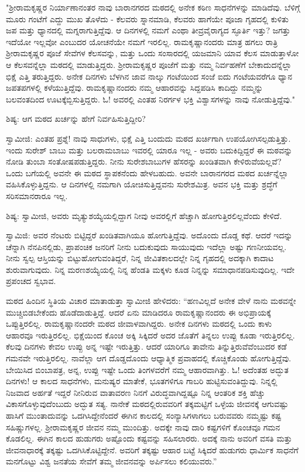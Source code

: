 "ಶ‍್ರೀರಾಮಕೃಷ್ಣರ ನಿರ್ಯಾಣಾನಂತರ ನಾವು ಬಾರಾನಗರದ ಮಠದಲ್ಲಿ ಅನೇಕ ಕಠಿಣ ಸಾಧನೆಗಳನ್ನು ಮಾಡಿದೆವು. ಬೆಳಿಗ್ಗೆ ಮೂರು ಗಂಟೆಗೆ ಎದ್ದು ಮುಖ ತೊಳೆದು - ಕೆಲವರು ಸ್ನಾನಮಾಡಿ, ಕೆಲವರು ಹಾಗೆಯೇ ಪೂಜಾ ಗೃಹದಲ್ಲಿ ಕುಳಿತು ಜಪ ಮತ್ತು ಧ್ಯಾನದಲ್ಲಿ ಮಗ್ನರಾಗುತ್ತಿದ್ದೆವು. ಆ ದಿನಗಳಲ್ಲಿ ನಮಗೆ ಎಂಥಾ ತೀವ್ರವೈರಾಗ್ಯದ ಸ್ಫೂರ್ತಿ ಇತ್ತು? ಜಗತ್ತು ಇದೆಯೋ ಇಲ್ಲವೋ ಎಂಬುದರ ಯೋಚನೆಯೇ ನಮಗೆ ಇರಲಿಲ್ಲ. ರಾಮಕೃಷ್ಣಾನಂದರು ಮಾತ್ರ ಹಗಲು ರಾತ್ರಿ ಶ‍್ರೀರಾಮಕೃಷ್ಣರ ಪೂಜೆ ಸೇವೆಗಳ ಕೆಲಸವನ್ನು, ಮತ್ತು ಒಂದು ಸಂಸಾರದಲ್ಲಿ ಯಜಮಾನಿ ಯಾವ ಕೆಲಸ ಮಾಡುತ್ತಾಳೋ ಆ ಕೆಲಸವನ್ನೆಲ್ಲಾ ಮಠದಲ್ಲಿ ಮಾಡುತ್ತಿದ್ದರು. ಶ‍್ರೀರಾಮಕೃಷ್ಣರ ಪೂಜೆಗೆ ಮತ್ತು ನಮ್ಮ ನಿರ್ವಹಣೆಗೆ ಬೇಕಾದುದನ್ನೆಲ್ಲಾ ಭಿಕ್ಷೆ ಎತ್ತಿ ತರುತ್ತಿದ್ದರು. ಅನೇಕ ದಿನಗಳು ಬೆಳಗಿನ ಜಾವ ನಾಲ್ಕು ಗಂಟೆಯಿಂದ ಸಂಜೆ ಐದು ಗಂಟೆಯವರೆಗೂ ಧ್ಯಾನ ಜಪತಪಗಳಲ್ಲಿ ಕಳೆಯುತ್ತಿದ್ದೆವು. ರಾಮಕೃಷ್ಣಾನಂದರು ನಮ್ಮ ಆಹಾರವನ್ನು ಸಿದ್ದಪಡಿಸಿ ಕಾದಿದ್ದು ನಮ್ಮನ್ನು ಬಲವಂತದಿಂದ ಊಟಕ್ಕೆಬ್ಬಿಸುತ್ತಿದ್ದರು. ಓ! ಅವರಲ್ಲಿ ಎಂತಹ ನಿರರ್ಗಳ ಭಕ್ತಿ ವಿಶ್ವಾಸಗಳನ್ನು ನಾವು ನೋಡುತ್ತಿದ್ದೆವು."

ಶಿಷ್ಯ: ಆಗ ಮಠದ ಖರ್ಚನ್ನು ಹೇಗೆ ನಿರ್ವಹಿಸುತ್ತಿದ್ದೀರಿ?

ಸ್ವಾಮೀಜಿ: ಎಂತಹ ಪ್ರಶ್ನೆ! ನಾವು ಸಾಧುಗಳು, ಭಿಕ್ಷೆ ಎತ್ತಿ ಬಂದುದು ಮಠದ ಖರ್ಚಿಗಾಗಿ ಉಪಯೋಗಿಸಲ್ಪಡುತ್ತಿತ್ತು. ಇಂದು ಸುರೇಶ್ ಬಾಬು ಮತ್ತು ಬಲರಾಮಬಾಬು ಇವರಲ್ಲಿ ಯಾರೂ ಇಲ್ಲ - ಅವರು ಬದುಕಿದ್ದಿದ್ದರೆ ಈ ಮಠವನ್ನು ನೋಡಿ ತುಂಬಾ ಸಂತೋಷಪಡುತ್ತಿದ್ದರು. ನೀನು ಸುರೇಶಬಾಬುಗಳ ಹೆಸರನ್ನು ಖಂಡಿತವಾಗಿ ಕೇಳಿರುವೆಯಲ್ಲವೆ? ಒಂದು ಬಗೆಯಲ್ಲಿ ಅವನೇ ಈ ಮಠದ ಸ್ಥಾಪಕನೆಂದು ಹೇಳಬಹುದು. ಅವನೇ ಬಾರಾನಗರದ ಮಠದ ಖರ್ಚನ್ನೆಲ್ಲಾ ವಹಿಸಿಕೊಳ್ಳುತ್ತಿದ್ದನು. ಆ ದಿನಗಳಲ್ಲಿ ನಮಗಾಗಿ ಯೋಚಿಸುತ್ತಿದ್ದವನು ಸುರೇಶಮಿತ್ರ. ಅವನ ಭಕ್ತಿ ಮತ್ತು ಶ್ರದ್ಧೆಗೆ ಸರಿಸಮಾನರಾರೂ ಇಲ್ಲ.

ಶಿಷ್ಯ: ಸ್ವಾಮೀಜಿ, ಅವರು ಮೃತ್ಯುಶಯ್ಯೆಯಲ್ಲಿದ್ದಾಗ ನೀವು ಅವರಲ್ಲಿಗೆ ಹೆಚ್ಚಾಗಿ ಹೋಗುತ್ತಿರಲಿಲ್ಲವೆಂದು ಕೇಳಿದೆ.

ಸ್ವಾಮಿಜಿ: ಅವರ ನೆಂಟರು ಬಿಟ್ಟಿದ್ದರೆ ಖಂಡಿತವಾಗಿಯೂ ಹೋಗುತ್ತಿದ್ದೆವು. ಅದೊಂದು ದೊಡ್ಡ ಕಥೆ. ಆದರೆ ಇದನ್ನು ಚೆನ್ನಾಗಿ ನೆನಪಿನಲ್ಲಿಡು, ಪ್ರಾಪಂಚಿಕ ಜನರಿಗೆ ನೀನು ಬದುಕುವುದು ಸಾಯುವುದು ಇದೆಲ್ಲಾ ಅಷ್ಟು ಗಣನೀಯವಲ್ಲ. ನೀನು ಸ್ವಲ್ಪ ಆಸ್ತಿಯನ್ನು ಬಿಟ್ಟುಹೋಗುವಂತಿದ್ದರೆ, ನಿನ್ನ ಜೀವಿತಕಾಲದಲ್ಲೇ ನಿನ್ನ ಗೃಹದಲ್ಲಿ ಅದಕ್ಕಾಗಿ ಕಾದಾಟ ಶುರುವಾಗುವುದು. ನಿನ್ನ ಮರಣಶಯ್ಯೆಯಲ್ಲಿ ನಿನ್ನ ಹೆಂಡತಿ ಮಕ್ಕಳು ಕೂಡ ನಿನ್ನನ್ನು ಸಮಾಧಾನಪಡಿಸುವುದಿಲ್ಲ. ಇದೇ ಪ್ರಪಂಚದ ಸ್ವಭಾವ.

ಮಠದ ಹಿಂದಿನ ಸ್ಥಿತಿಯ ವಿಚಾರ ಮಾತಾಡುತ್ತಾ ಸ್ವಾಮೀಜಿ ಹೇಳಿದರು: “ಹಣವಿಲ್ಲದೆ ಅನೇಕ ವೇಳೆ ನಾನು ಮಠವನ್ನೇ ಮುಚ್ಚಿಬಿಡಬೇಕೆಂದು ಹೊಡೆದಾಡುತ್ತಿದ್ದೆ. ಆದರೆ ಏನು ಮಾಡಿದರೂ ರಾಮಕೃಷ್ಣಾನಂದರು ಈ ಅಭಿಪ್ರಾಯಕ್ಕೆ ಒಪ್ಪುತ್ತಿರಲಿಲ್ಲ. ರಾಮಕೃಷ್ಣಾನಂದರೇ ಮಠದ ಜೀವಾಳವಾಗಿದ್ದರು. ಅನೇಕ ದಿನಗಳು ಮಠದಲ್ಲಿ ಒಂದು ಕಾಳು ಆಹಾರವೂ ಇರುತ್ತಿರಲಿಲ್ಲ. ಭಿಕ್ಷೆಯಿಂದ ಕೊಂಚ ಅಕ್ಕಿ ಸಿಕ್ಕಿದರೆ ಅದರ ಜೊತೆಗೆ ತಿನ್ನಲು ಉಪ್ಪು ಕೂಡಾ ಇರುತ್ತಿರಲಿಲ್ಲ. ಕೆಲವು ದಿನಗಳು ಕೇವಲ ಉಪ್ಪು ಅನ್ನ ಇಷ್ಟೇ ಇರುತ್ತಿತ್ತು. ಆದರೆ ಯಾರಿಗೂ ತಾವೇನು ತಿನ್ನುತ್ತಿರುವೆವೆಂಬುದರ ಕಡೆ ಗಮನವೇ ಇರುತ್ತಿರಲಿಲ್ಲ. ನಾವೆಲ್ಲಾ ಆಗ ದೊಡ್ಡದೊಂದು ಆಧ್ಯಾತ್ಮಿಕ ಪ್ರವಾಹದಲ್ಲಿ ಕೊಚ್ಚಿಕೊಂಡು ಹೋಗುತ್ತಿದ್ದೆವು. ಬೇಯಿಸಿದ ಬಿಂಬಾಪತ್ರ, ಅನ್ನ, ಉಪ್ಪು ಇಷ್ಟೇ ಒಂದು ತಿಂಗಳವರೆಗೆ ನಮ್ಮ ಆಹಾರವಾಗಿತ್ತು. ಓ! ಅದೆಂತಹ ಅದ್ಭುತ ದಿನಗಳು! ಆ ಕಾಲದ ಸಾಧನೆಗಳು, ಮನುಷ್ಯರ ಮಾತೇಕೆ, ಭೂತಗಳಿಗೂ ಗಾಬರಿ ಹುಟ್ಟಿಸುವಂತಿದ್ದುವು. ನಿನ್ನಲ್ಲಿ ನಿಜವಾದ ಅರ್ಹತೆ ಇದ್ದರೆ ನೀನಿರುವ ವಾತಾವರಣ ನಿನಗೆ ವಿರುದ್ಧವಾಗಿದ್ದಷ್ಟೂ ನಿನ್ನ ಆಂತರಿಕ ಶಕ್ತಿ ಹೆಚ್ಚು ವಿಕಾಸಗೊಳ್ಳುವುದೆಂಬುದು ಅದ್ಭುತ ಸತ್ಯ. ನಾನೇಕೆ ಮಠದಲ್ಲಿರುವವರಿಗೆ ತಕ್ಕಮಟ್ಟಿಗೆ ಒಳ್ಳೆಯ ಜೀವನಕ್ಕೆ ಆಗುವಷ್ಟು ಹಾಸಿಗೆ ಮುಂತಾದುವನ್ನು ಒದಗಿಸಿದ್ದೇನೆಂದರೆ ಈಗಿನ ಕಾಲದಲ್ಲಿ ಸಂನ್ಯಾಸಿಗಳಾಗಲು ಬರುವವರು ನಮ್ಮಷ್ಟು ಕಷ್ಟ ಸಹಿಷ್ಣುಗಳಲ್ಲ. ಶ‍್ರೀರಾಮಕೃಷ್ಣರ ಜೀವನ ನಮ್ಮ ಮುಂದಿತ್ತು. ಅದಕ್ಕೇ ನಾವು ದಾರಿ ಕಷ್ಟಗಳಿಗೆ ಕೊಂಚವೂ ಗಮನ ಕೊಡಲಿಲ್ಲ. ಈಗಿನ ಕಾಲದ ಹುಡುಗರು ಅಷ್ಟೊಂದು ಕಷ್ಟವನ್ನು ಸಹಿಸಲಾರರು. ಅದಕ್ಕೆ ನಾನು ಅವರಿಗೆ ವಸತಿ ಮತ್ತು ಜೀವನಾಧಾರಕ್ಕೆ ತಕ್ಕಷ್ಟು ಒದಗಿಸಿಕೊಟ್ಟಿದ್ದೇನೆ. ಅವರಿಗೆ ತಕ್ಕಷ್ಟು ಆಹಾರ ಬಟ್ಟೆ ಸಿಕ್ಕಿದರೆ ಹುಡುಗರು ಧಾರ್ಮಿಕ ಸಾಧನೆಗೆ ಮನಗೊಟ್ಟು ವಿಶ್ವ ಜನತೆಯ ಸೇವೆಗೆ ತಮ್ಮ ಜೀವನವನ್ನು ಅರ್ಪಿಸಲು ಕಲಿಯುವರು.”

